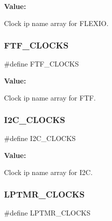 {\bfseries Value\+:}
\begin{DoxyCode}{0}
\DoxyCodeLine{\{                  \(\backslash\)}
\DoxyCodeLine{    \}}

\end{DoxyCode}


Clock ip name array for F\+L\+E\+X\+IO. 

\mbox{\label{group__clock_ga7424481c4167462b8b5814485b967280}} 
\subsubsection{\texorpdfstring{FTF\_CLOCKS}{FTF\_CLOCKS}}
{\footnotesize\ttfamily \#define F\+T\+F\+\_\+\+C\+L\+O\+C\+KS}

{\bfseries Value\+:}
\begin{DoxyCode}{0}
\DoxyCodeLine{\{               \(\backslash\)}
\DoxyCodeLine{    \}}

\end{DoxyCode}


Clock ip name array for F\+TF. 

\mbox{\label{group__clock_gac0c74371f4f724c78ef233de79c3cf14}} 
\subsubsection{\texorpdfstring{I2C\_CLOCKS}{I2C\_CLOCKS}}
{\footnotesize\ttfamily \#define I2\+C\+\_\+\+C\+L\+O\+C\+KS}

{\bfseries Value\+:}
\begin{DoxyCode}{0}
\DoxyCodeLine{\{                            \(\backslash\)}
\DoxyCodeLine{    \}}

\end{DoxyCode}


Clock ip name array for I2C. 

\mbox{\label{group__clock_gab37faf7ae1a03862fd7e9b501e7e41ef}} 
\subsubsection{\texorpdfstring{LPTMR\_CLOCKS}{LPTMR\_CLOCKS}}
{\footnotesize\ttfamily \#define L\+P\+T\+M\+R\+\_\+\+C\+L\+O\+C\+KS}

